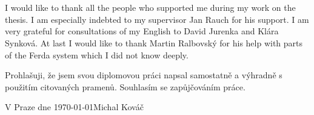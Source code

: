 \documentclass[a4paper,12pt]{book}
\begin{document}
~

\newpage

\normalsize %
\ \vspace{10mm}

\noindent I would like to thank all the people who supported me during my work on the thesis. I am especially indebted to my supervisor Jan Rauch for his support. I am very grateful for consultations of my English to David Jurenka and Klára Synková. At last I would like to thank Martin Ralbovský for his help with parts of the Ferda system which I did not know deeply.

\vspace{\fill}
Prohlašuji, že jsem svou diplomovou práci napsal samostatně a výhradně s použitím citovaných pramenů. Souhlasím se zapůjčováním práce.

\bigskip

\noindent V Praze dne \today \hspace{\fill}Michal Kováč

~
\tableofcontents
\end{document}

